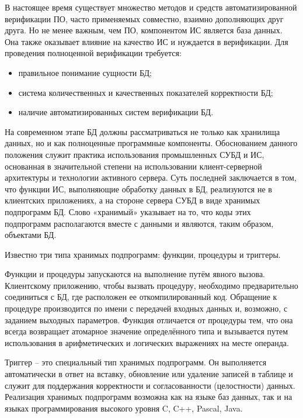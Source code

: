 В настоящее время существует множество методов и средств автоматизированной верификации ПО, часто применяемых
совместно, взаимно дополняющих друг друга. Но не менее важным, чем ПО, компонентом ИС является база данных.
Она также оказывает влияние на качество ИС и нуждается в верификации. Для проведения полноценной
верификации требуется:
\begin{itemize}
    \item правильное понимание сущности БД;

    \item система количественных и качественных показателей корректности БД;

    \item наличие автоматизированных систем верификации БД.
\end{itemize}

На современном этапе БД должны рассматриваться не только как хранилища данных, но и как полноценные программные
компоненты. Обоснованием данного положения служит практика использования промышленных СУБД и ИС, основанная
в значительной степени на использовании клиент-серверной архитектуры и технологии активного сервера. Суть последней
заключается в том, что функции ИС, выполняющие обработку данных в БД, реализуются не в клиентских приложениях, а
на стороне сервера СУБД в виде хранимых подпрограмм БД. Слово «хранимый» указывает на то, что коды этих подпрограмм
располагаются вместе с данными и являются, таким образом, объектами БД.

Известно три типа хранимых подпрограмм: функции, процедуры и триггеры.

Функции и процедуры запускаются на выполнение путём явного вызова. Клиентскому приложению, чтобы вызвать процедуру,
необходимо предварительно соединиться с БД, где расположен ее откомпилированный код. Обращение к процедуре
производится по имени с передачей входных данных и, возможно, с заданием выходных параметров. Функция отличается
от процедуры тем, что она всегда возвращает атомарное значение определённого типа и вызывается путем использования
в арифметических и логических выражениях на месте операнда.

Триггер – это специальный тип хранимых подпрограмм. Он выполняется автоматически в ответ на вставку, обновление
или удаление записей в таблице и служит для поддержания корректности и согласованности (целостности) данных.
Реализация хранимых подпрограмм возможна как на языке баз данных, так и на языках программирования высокого уровня
C, C++, Pascal, Java.

